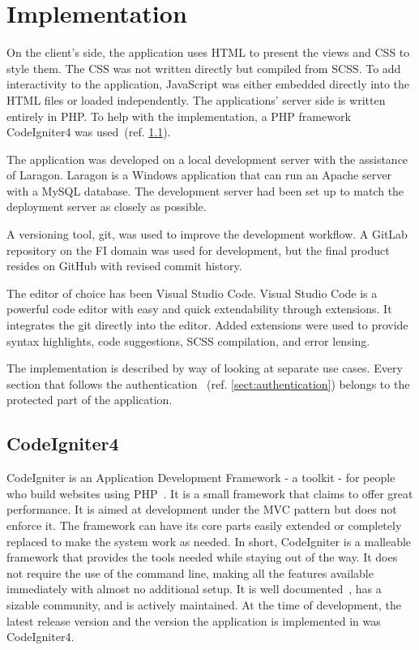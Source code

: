 \documentclass[
  digital,     %
  oneside,     %
  nosansbold,  %
  colorbold, %
  lof,         %
  lot,         %
]{fithesis4}
\newcommand{\cref}[1]{(ref. \ref{#1})}
\begin{document}
\chapter{Implementation}

On the client's side, the application uses HTML to present the views and CSS to style them. The CSS
was not written directly but compiled from SCSS. To add interactivity to the application, JavaScript
was either embedded directly into the HTML files or loaded independently. The applications' server
side is written entirely in PHP. To help with the implementation, a PHP framework CodeIgniter4 was
used~\cref{sect:codeigniter}.

The application was developed on a local development server with the assistance of Laragon. Laragon
is a Windows application that can run an Apache server with a MySQL database. The development
server had been set up to match the deployment server as closely as possible.

A versioning tool, git, was used to improve the development workflow. A GitLab repository on the FI
domain was used for development, but the final product resides on GitHub with revised commit
history.

The editor of choice has been Visual Studio Code. Visual Studio Code is a powerful code editor with
easy and quick extendability through extensions. It integrates the git directly into the editor. Added
extensions were used to provide syntax highlights, code suggestions, SCSS compilation, and error
lensing.

The implementation is described by way of looking at separate use cases. Every section that follows
the authentication ~\cref{sect:authentication} belongs to the protected part of the application. 

\section{CodeIgniter4}
\label{sect:codeigniter}

CodeIgniter is an Application Development Framework - a toolkit - for people who build websites
using PHP~\cite{codeigniter}. It is a small framework that claims to offer great performance. It is
aimed at development under the MVC pattern but does not enforce it. The framework can have its
core parts easily extended or completely replaced to make the system work as needed. In short,
CodeIgniter is a malleable framework that provides the tools needed while staying out of the way. It
does not require the use of the command line, making all the features available immediately with
almost no additional setup. It is well documented~\cite{codeigniter4}, has a sizable community, and is
actively maintained. At the time of development, the latest release version and the version the
application is implemented in was CodeIgniter4. 
\end{document}
